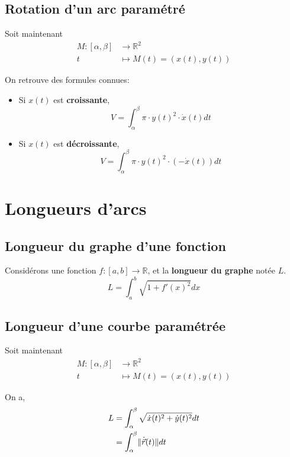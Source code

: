 \documentclass[10pt,a4paper]{book}
\newcommand{\R}{\mathbb{R}}
\DeclarePairedDelimiter\norm{\lVert}{\rVert}
\begin{document}
\subsection{Rotation d'un arc paramétré}
Soit maintenant
\begin{equation*}
\begin{split}
M:[\alpha,\beta] & \rightarrow \R^2 \\
t & \mapsto M(t) = (x(t), y(t))
\end{split}
\end{equation*}

On retrouve des formules connues:
\begin{itemize}
\item Si $x(t)$ est \textbf{croissante},
\[V = \int_\alpha^\beta \pi \cdot y(t)^2 \cdot \dot{x}(t)dt\]
\item Si $x(t)$ est \textbf{décroissante},
\[V = \int_\alpha^\beta \pi \cdot y(t)^2 \cdot (-\dot{x}(t))dt\]
\end{itemize}

\section{Longueurs d'arcs}

\subsection{Longueur du graphe d'une fonction}
Considérons une fonction $f:[a,b]\rightarrow \R$, et la \textbf{longueur du graphe} notée $L$.
\[L = \int_a^b \sqrt{1 + f'(x)^2}dx\]

\subsection{Longueur d'une courbe paramétrée}
Soit maintenant
\begin{equation*}
\begin{split}
M:[\alpha,\beta] & \rightarrow \R^2 \\
t & \mapsto M(t) = (x(t), y(t))
\end{split}
\end{equation*}

On a,
\begin{equation*}
\begin{split}
L &= \int_\alpha^\beta \sqrt{\dot{x}(t)^2 + \dot{y}(t)^2}dt \\
&= \int_\alpha^\beta \norm{\dot{\vec{r}}(t)}dt
\end{split}
\end{equation*}
\end{document}
